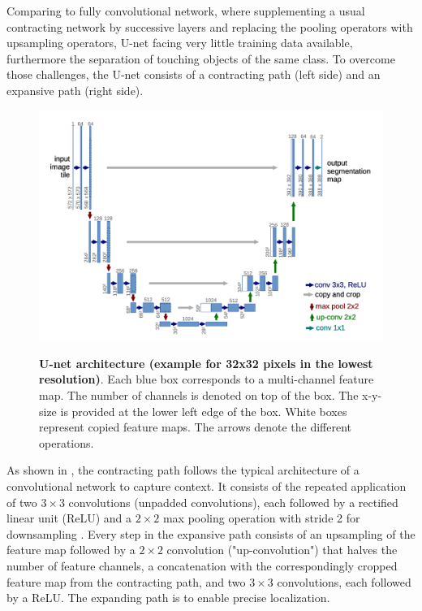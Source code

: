 Comparing to fully convolutional network, where supplementing a usual contracting network by successive layers and replacing the pooling operators with upsampling operators,  U-net \cite{unet} facing very little training data available, furthermore the separation of touching objects of the same class. To overcome those challenges, the U-net consists of a contracting path (left side) and an expansive path (right side). 

\begin{figure}[t]
\begin{center}
\centering
\includegraphics[width=\textwidth]{thesis-template-master/images/unet.png}
\label{fig:cellnet}
\end{center}
\caption{\textbf{U-net architecture (example for 32x32 pixels in the lowest resolution)\cite{unet}}. Each blue box corresponds to a multi-channel feature map. The number of channels is denoted on top of the box. The x-y-size is provided at the lower left edge of the box. White boxes represent copied feature maps. The arrows denote the different operations.}
\label{fig:2.2}
\end{figure}

As shown in \eg{}, the contracting path follows the typical architecture of a convolutional network to capture context. It consists of the repeated application of two $3\times3$ convolutions (unpadded convolutions), each followed by a rectified linear unit (ReLU) and a $2\times2$ max pooling operation with stride 2 for downsampling \cite{unet}. Every step in the expansive path consists of an upsampling of the feature map followed by a $2\times2$ convolution ("up-convolution") that halves the number of feature channels, a concatenation with the correspondingly cropped feature map from the contracting path, and two $3\times3$ convolutions, each followed by a ReLU\cite{unet}. The expanding path is to enable precise localization.

